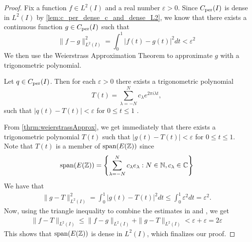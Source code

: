 \documentclass[../thesis.tex]{subfiles}
\begin{document}
\begin{proof}
    Fix a function $f\in L^2(I)$ and a real number $\varepsilon >0$. Since $C_{\text{per}}(I)$ is dense in $L^2(I)$ by \cref{lem:c_per_dense_c_and_dense_L2}, we know that there exists a continuous function $g \in C_{\text{per}}(I)$ such that
    \begin{equation}\label{eq:estimate_1}
        \| f-g \|_{L^2(I)}^2 = \int_0^1 \left|f(t)-g(t) \right|^2dt < \varepsilon^2
    \end{equation}
    We then use the Weierstrass Approximation Theorem to approximate $g$ with a trigonometric polynomial. 
    \begin{theorem}\label{thrm:weierstrassApprox}
        Let $q\in C_{\text{per}} (I)$. Then for each $\varepsilon>0$ there exists a trigonometric polynomial %
        \begin{equation}
            T(t) = \sum_{\lambda=-N}^N c_\lambda e^{2\pi i \lambda t},
        \end{equation}
        such that $|q(t)-T(t)|<\varepsilon$ for $0 \leq t \leq 1$ \cite[p.~202]{durenInvitationClassicalAnalysis2012}.
    \end{theorem}
    From \cref{thrm:weierstrassApprox}, we get immediately that there exists a trigonometric polynomial $T(t)$ such that $|g(t)-T(t)|<\varepsilon$ for $0 \leq t \leq 1$. Note that $T(t)$ is a member of $\operatorname{span}(E(\mathbb{Z}))$ since %
    \begin{equation*}
        \operatorname{span}(E(\mathbb{Z}))=\left\{\sum_{\lambda=-N}^N c_\lambda e_\lambda : N \in \mathbb{N}, c_\lambda \in \mathbb{C}\right\}
    \end{equation*}
    We have that
    \begin{align}\label{eq:estimate_2}
        \| g-T \|_{L^2(I)}^2 = \int_0^1 \left|g(t)-T(t) \right|^2dt \leq \int_0^1 \varepsilon^2 dt = \varepsilon^2.
    \end{align}
    Now, using the triangle inequality to combine the estimates in  and , we get
    \begin{align*}
        \| f-T\|_{L^2(I)} \leq  \| f-g\|_{L^2(I)} +\| g-T\|_{L^2(I)} < \varepsilon + \varepsilon =  2 \varepsilon
    \end{align*}
    This shows that $\operatorname{span}(E(\mathbb{Z}))$ is dense in $L^2(I)$, which finalizes our proof.
\end{proof}
\end{document}
